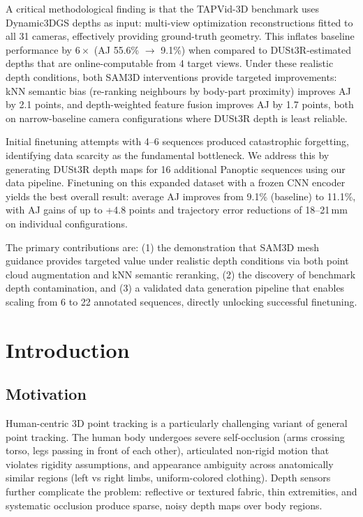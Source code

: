 \documentclass[12pt, a4paper, oneside]{report}
\begin{document}
A critical methodological finding is that the TAPVid-3D benchmark uses Dynamic3DGS depths as input: multi-view optimization reconstructions fitted to all 31 cameras, effectively providing ground-truth geometry. This inflates baseline performance by $6\times$ (AJ 55.6\% $\to$ 9.1\%) when compared to DUSt3R-estimated depths that are online-computable from 4 target views. Under these realistic depth conditions, both SAM3D interventions provide targeted improvements: kNN semantic bias (re-ranking neighbours by body-part proximity) improves AJ by 2.1 points, and depth-weighted feature fusion improves AJ by 1.7 points, both on narrow-baseline camera configurations where DUSt3R depth is least reliable.

Initial finetuning attempts with 4--6 sequences produced catastrophic forgetting, identifying data scarcity as the fundamental bottleneck. We address this by generating DUSt3R depth maps for 16 additional Panoptic sequences using our data pipeline. Finetuning on this expanded dataset with a frozen CNN encoder yields the best overall result: average AJ improves from 9.1\% (baseline) to 11.1\%, with AJ gains of up to +4.8 points and trajectory error reductions of 18--21\,mm on individual configurations.

The primary contributions are: (1) the demonstration that SAM3D mesh guidance provides targeted value under realistic depth conditions via both point cloud augmentation and kNN semantic reranking, (2) the discovery of benchmark depth contamination, and (3) a validated data generation pipeline that enables scaling from 6 to 22 annotated sequences, directly unlocking successful finetuning.

\clearpage

\tableofcontents
\clearpage
\hypersetup{pageanchor=true}

\chapter{Introduction}
\label{ch:intro}

\section{Motivation}
Human-centric 3D point tracking is a particularly challenging variant of general point tracking. The human body undergoes severe self-occlusion (arms crossing torso, legs passing in front of each other), articulated non-rigid motion that violates rigidity assumptions, and appearance ambiguity across anatomically similar regions (left vs right limbs, uniform-colored clothing). Depth sensors further complicate the problem: reflective or textured fabric, thin extremities, and systematic occlusion produce sparse, noisy depth maps over body regions.
\end{document}
